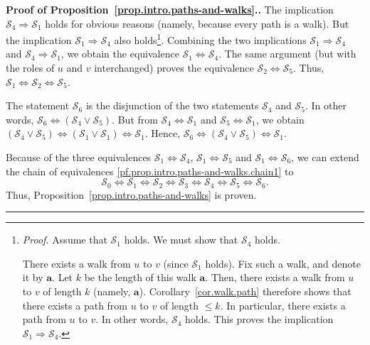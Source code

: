 \documentclass[numbers=enddot,12pt,final,onecolumn,notitlepage]{scrartcl}%
\theoremstyle{definition}
\newenvironment{proof}[1][Proof]{\noindent\textbf{#1.} }{\ \rule{0.5em}{0.5em}}
\newcommand{\tup}[1]{\left( #1 \right)}
\begin{document}
\begin{proof}[Proof of Proposition~\ref{prop.intro.paths-and-walks}.]
The implication $\mathcal{S}_4 \Longrightarrow \mathcal{S}_1$ holds
for obvious reasons (namely, because every path is a walk). But
the implication $\mathcal{S}_1 \Longrightarrow \mathcal{S}_4$ also
holds\footnote{\textit{Proof.} Assume that $\mathcal{S}_1$
holds. We must show that $\mathcal{S}_4$ holds.

There exists a walk from $u$ to $v$ (since $\mathcal{S}_1$ holds).
Fix such a walk, and denote it by $\mathbf{a}$. Let $k$ be the length
of this walk $\mathbf{a}$. Then, there exists a walk from $u$ to $v$ of
length $k$ (namely, $\mathbf{a}$). Corollary~\ref{cor.walk.path}
therefore shows that there exists a path from $u$ to $v$ of length
$\leq k$. In particular, there exists a path from $u$ to $v$. In other
words, $\mathcal{S}_4$ holds. This proves the implication
$\mathcal{S}_1 \Longrightarrow \mathcal{S}_4$.}. Combining the two
implications $\mathcal{S}_1 \Longrightarrow \mathcal{S}_4$ and
$\mathcal{S}_4 \Longrightarrow \mathcal{S}_1$, we obtain the
equivalence
$\mathcal{S}_1 \Longleftrightarrow \mathcal{S}_4$. The same argument
(but with the roles of $u$ and $v$ interchanged) proves the
equivalence
$\mathcal{S}_2 \Longleftrightarrow \mathcal{S}_5$. Thus,
$\mathcal{S}_1 \Longleftrightarrow \mathcal{S}_2
\Longleftrightarrow \mathcal{S}_5$.

The statement $\mathcal{S}_6$ is the disjunction of the two statements
$\mathcal{S}_4$ and $\mathcal{S}_5$. In other words,
$\mathcal{S}_6 \Longleftrightarrow
\tup{\mathcal{S}_4 \vee \mathcal{S}_5}$. But from
$\mathcal{S}_4 \Longleftrightarrow \mathcal{S}_1$ and
$\mathcal{S}_5 \Longleftrightarrow \mathcal{S}_1$, we obtain
$\tup{\mathcal{S}_4 \vee \mathcal{S}_5}
\Longleftrightarrow \tup{\mathcal{S}_1 \vee \mathcal{S}_1}
\Longleftrightarrow \mathcal{S}_1$. Hence,
$\mathcal{S}_6 \Longleftrightarrow
\tup{\mathcal{S}_4 \vee \mathcal{S}_5}
\Longleftrightarrow \mathcal{S}_1$.

Because of the three equivalences
$\mathcal{S}_1 \Longleftrightarrow \mathcal{S}_4$,
$\mathcal{S}_1 \Longleftrightarrow \mathcal{S}_5$ and
$\mathcal{S}_1 \Longleftrightarrow \mathcal{S}_6$, we can extend the
chain of equivalences \eqref{pf.prop.intro.paths-and-walks.chain1}
to
\[
\mathcal{S}_0 \Longleftrightarrow \mathcal{S}_1 \Longleftrightarrow
\mathcal{S}_2 \Longleftrightarrow \mathcal{S}_3 \Longleftrightarrow
\mathcal{S}_4 \Longleftrightarrow \mathcal{S}_5 \Longleftrightarrow
\mathcal{S}_6 .
\]
Thus, Proposition~\ref{prop.intro.paths-and-walks} is proven.
\end{proof}
\end{document}

